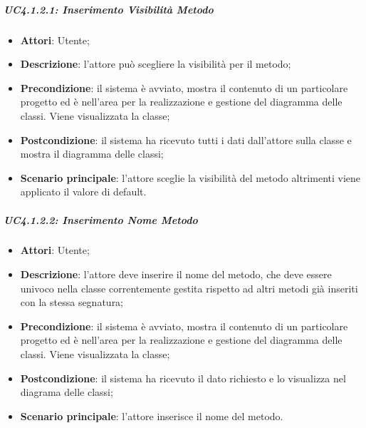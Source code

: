 \subparagraph{UC4.1.2.1: Inserimento Visibilità Metodo}
\label{UC4.1.2.1}
\begin{itemize}
	\item \textbf{Attori}: Utente;
	\item \textbf{Descrizione}: l'attore può scegliere la visibilità per il metodo;
	\item \textbf{Precondizione}:  il sistema è avviato, mostra il contenuto di un particolare progetto ed è nell'area per la realizzazione e gestione del diagramma delle classi. Viene visualizzata la classe;
	\item \textbf{Postcondizione}: il sistema ha ricevuto tutti i dati dall'attore sulla classe e mostra il diagramma delle classi;
	\item \textbf{Scenario principale}: l'attore sceglie la visibilità del metodo altrimenti viene applicato il valore di default.
\end{itemize}

\subparagraph{UC4.1.2.2: Inserimento Nome Metodo}
\label{UC4.1.2.2}
\begin{itemize}
	\item \textbf{Attori}: Utente;
	\item \textbf{Descrizione}: l'attore deve inserire il nome del metodo, che deve essere univoco nella classe correntemente gestita rispetto ad altri metodi già inseriti con la stessa segnatura;
	\item \textbf{Precondizione}: il sistema è avviato, mostra il contenuto di un particolare progetto ed è nell'area per la realizzazione e gestione del diagramma delle classi. Viene visualizzata la classe;
	\item \textbf{Postcondizione}: il sistema ha ricevuto il dato richiesto e lo visualizza nel diagrama delle classi;
	\item \textbf{Scenario principale}: l'attore inserisce il nome del metodo.
\end{itemize}

